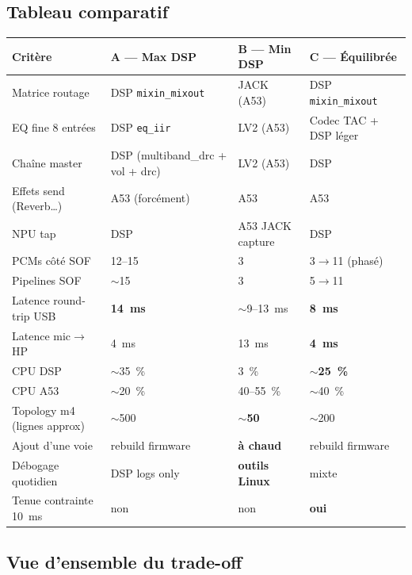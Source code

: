 \documentclass[11pt,a4paper]{article}
\begin{document}
\subsection{Tableau comparatif}
\begin{center}
\footnotesize
\begin{tabularx}{\textwidth}{lXXX}
\toprule
\textbf{Critère} & \textbf{A --- Max DSP} & \textbf{B --- Min DSP} & \textbf{C --- Équilibrée} \\
\midrule
Matrice routage & DSP \texttt{mixin\_mixout} & JACK (A53) & DSP \texttt{mixin\_mixout} \\
EQ fine 8 entrées & DSP \texttt{eq\_iir} & LV2 (A53) & Codec TAC + DSP léger \\
Chaîne master & DSP (multiband\_drc + vol + drc) & LV2 (A53) & DSP \\
Effets send (Reverb\ldots) & A53 (forcément) & A53 & A53 \\
NPU tap & DSP & A53 JACK capture & DSP \\
PCMs côté SOF & 12--15 & 3 & 3$\rightarrow$11 (phasé) \\
Pipelines SOF & $\sim$15 & 3 & 5$\rightarrow$11 \\
Latence round-trip USB & \textcolor{red!70!black}{\textbf{14~ms}} & $\sim$9--13~ms & \textcolor{ca53}{\textbf{8~ms}} \\
Latence mic$\rightarrow$HP & 4~ms & 13~ms & \textcolor{ca53}{\textbf{4~ms}} \\
CPU DSP & $\sim$35~\% & 3~\% & \textbf{$\sim$25~\%} \\
CPU A53 & $\sim$20~\% & \textcolor{red!70!black}{40--55~\%} & $\sim$40~\% \\
Topology m4 (lignes approx) & \textcolor{red!70!black}{$\sim$500} & \textbf{$\sim$50} & $\sim$200 \\
Ajout d'une voie & rebuild firmware & \textbf{à chaud} & rebuild firmware \\
Débogage quotidien & DSP logs only & \textbf{outils Linux} & mixte \\
Tenue contrainte 10~ms & \textcolor{red!70!black}{non} & \textcolor{red!70!black}{non} & \textcolor{ca53}{\textbf{oui}} \\
\bottomrule
\end{tabularx}
\end{center}

\subsection{Vue d'ensemble du trade-off}
\end{document}
